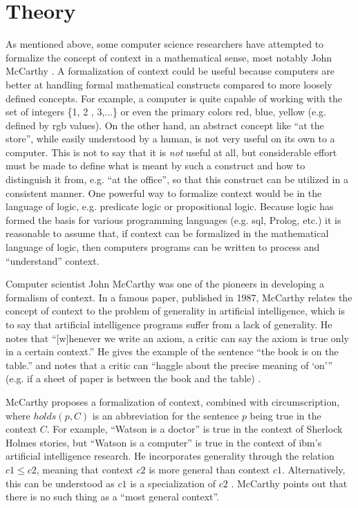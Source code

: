 \section{Theory}
\label{sec:theory}

As mentioned above, some computer science researchers have attempted to formalize the concept of context in a mathematical sense, most notably John McCarthy \cite{McCarthy1993} \cite{mccarthy1997formalizing} . A formalization of context could be useful because computers are better at handling formal mathematical constructs compared to more loosely defined concepts. For example, a computer is quite capable of working with the set of integers \{1, 2 , 3,...\} or even the primary colors {red, blue, yellow} (e.g. defined by \acrshort{rgb} values). On the other hand, an abstract concept like ``at the store'', while easily understood by a human, is not very useful on its own to a computer. This is not to say that it is \emph{not} useful at all, but considerable effort must be made to define what is meant by such a construct and how to distinguish it from, e.g. ``at the office'', so that this construct can be utilized in a consistent manner. One powerful way to formalize context would be in the language of logic, e.g. predicate logic or propositional logic. Because logic has formed the basis for various programming languages (e.g. \acrshort{sql}, Prolog, etc.) it is reasonable to assume that, if context can be formalized in the mathematical language of logic, then computers programs can be written to process and ``understand'' context.

Computer scientist John McCarthy was one of the pioneers in developing a formalism of context. In a famous paper, published in 1987, McCarthy relates the concept of context to the problem of generality in artificial intelligence, which is to say that artificial intelligence programs suffer from a lack of generality. He notes that ``[w]henever we write an axiom, a critic can say the axiom is true only in a certain context.'' He gives the example of the sentence ``the book is on the table.'' and notes that a critic can ``haggle about the precise meaning of `on'\thinspace'' (e.g. if a sheet of paper is between the book and the table) \cite{mccarthy1987generality}. 

McCarthy proposes a formalization of context, combined with circumscription, where $holds(p, C)$ is an abbreviation for the sentence $p$ being true in the context $C$. For example, ``Watson is a doctor'' is true in the context of Sherlock Holmes stories, but ``Watson is a computer'' is true in the context of \acrshort{ibm}'s artificial intelligence research. He incorporates generality through the relation $c1 \le c2$, meaning that context $c2$ is more general than context $c1$. Alternatively, this can be understood as $c1$ is a specialization of $c2$ \cite{akman1996steps}. McCarthy points out that there is no such thing as a ``most general context''.

